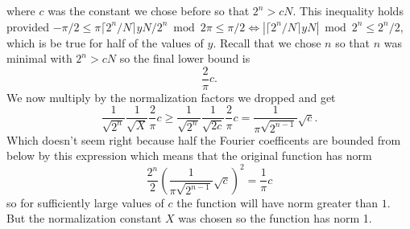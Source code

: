 \documentclass[10pt]{article}
\theoremstyle{plain}
\theoremstyle{definition}
\begin{document}
where \( c \) was the constant we chose before so that \( 2^n > cN \).
This inequality holds provided \(-\pi / 2 \leq  \pi \lceil 2^n / N \rceil yN / 2^{n} \bmod{2\pi}   \leq \pi / 2 \Leftrightarrow \left| \lceil 2^n / N \rceil yN\right| \bmod{2^n} \leq 2^n/2\), which is be true for half of the values of \( y \).
Recall that we chose \( n \) so that \( n \) was minimal with \( 2^n > cN \) so the final lower bound is
\[
    \frac{2}{\pi}c.
\]
We now multiply by the normalization factors we dropped and get
\[
    \frac{1}{\sqrt{2^n}}\frac{1}{\sqrt{X}}\frac{2}{\pi}c 
    \geq \frac{1}{\sqrt{2^n}}\frac{1}{\sqrt{2c}}\frac{2}{\pi}c 
    =\frac{1}{\pi\sqrt{2^{n-1}}}\sqrt{c}.
\]
Which doesn't seem right because half the Fourier coefficents are bounded from below by this expression which means that the original function has norm
\[
	\frac{2^n}{2}\left(\frac{1}{\pi\sqrt{2^{n-1}}}\sqrt{c} \right)^2
	=\frac{1}{\pi}c
\]
so for sufficiently large values of \( c \) the function will have norm greater than \( 1 \).
But the normalization constant \( X \) was chosen so the function has norm 1.
\end{document}
